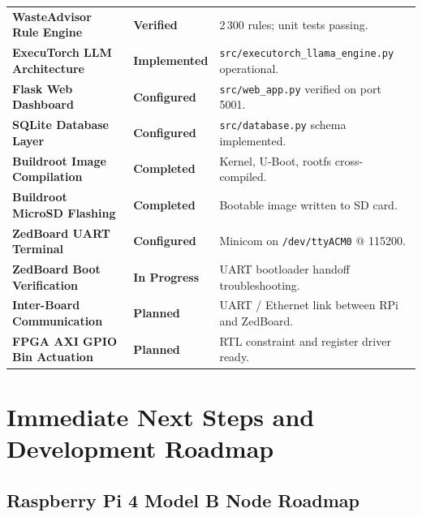 \documentclass[12pt,a4paper]{article}
\begin{document}
\begin{table}[H]
\begin{tabular}{llp{7.2cm}}
\textbf{WasteAdvisor Rule Engine}        & \textcolor{ecosortgreen}{\textbf{Verified}} & 2\,300 rules; unit tests passing. \\
\textbf{ExecuTorch LLM Architecture}     & \textcolor{ecosortgreen}{\textbf{Implemented}}& \texttt{src/executorch\_llama\_engine.py} operational. \\
\textbf{Flask Web Dashboard}             & \textcolor{ecosortgreen}{\textbf{Configured}} & \texttt{src/web\_app.py} verified on port 5001. \\
\textbf{SQLite Database Layer}           & \textcolor{ecosortgreen}{\textbf{Configured}} & \texttt{src/database.py} schema implemented. \\
\textbf{Buildroot Image Compilation}     & \textcolor{ecosortgreen}{\textbf{Completed}}  & Kernel, U-Boot, rootfs cross-compiled. \\
\textbf{Buildroot MicroSD Flashing}      & \textcolor{ecosortgreen}{\textbf{Completed}}  & Bootable image written to SD card. \\
\textbf{ZedBoard UART Terminal}          & \textcolor{ecosortgreen}{\textbf{Configured}} & Minicom on \texttt{/dev/ttyACM0} @ 115200. \\
\textbf{ZedBoard Boot Verification}      & \textcolor{warnyellow}{\textbf{In Progress}}  & UART bootloader handoff troubleshooting. \\
\textbf{Inter-Board Communication}       & \textcolor{warnyellow}{\textbf{Planned}}      & UART / Ethernet link between RPi and ZedBoard. \\
\textbf{FPGA AXI GPIO Bin Actuation}     & \textcolor{warnyellow}{\textbf{Planned}}      & RTL constraint and register driver ready. \\
\bottomrule
\end{tabular}
\end{table}

\clearpage

\section{Immediate Next Steps and Development Roadmap}

\subsection{Raspberry Pi 4 Model B Node Roadmap}
\end{document}
